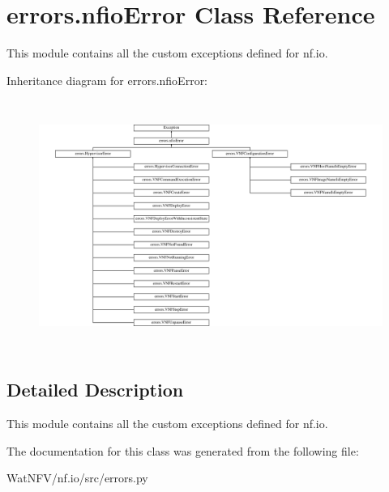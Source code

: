 \hypertarget{classerrors_1_1nfioError}{\section{errors.\-nfio\-Error Class Reference}
\label{classerrors_1_1nfioError}
}


This module contains all the custom exceptions defined for nf.\-io.  


Inheritance diagram for errors.\-nfio\-Error\-:\begin{figure}[H]
\begin{center}
\leavevmode
\includegraphics[height=8.205128cm]{classerrors_1_1nfioError}
\end{center}
\end{figure}


\subsection{Detailed Description}
This module contains all the custom exceptions defined for nf.\-io. 

The documentation for this class was generated from the following file\-:\begin{DoxyCompactItemize}
\item 
Wat\-N\-F\-V/nf.\-io/src/errors.\-py\end{DoxyCompactItemize}
